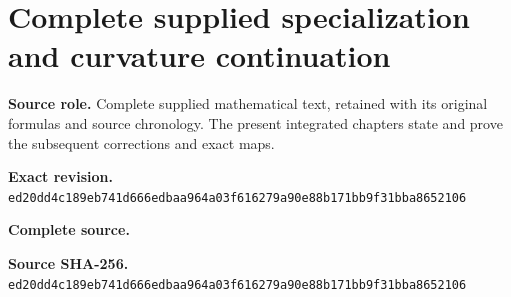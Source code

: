 \begingroup
\sloppy
\small
\clearpage
\section{Complete supplied specialization and curvature continuation}
\noindent\textbf{Source role.} Complete supplied mathematical text, retained with its original formulas and source chronology. The present integrated chapters state and prove the subsequent corrections and exact maps.\par
\noindent\textbf{Exact revision.} \nolinkurl{ed20dd4c189eb741d666edbaa964a03f616279a90e88b171bb9f31bba8652106}\par
\noindent\textbf{Complete source.} \par
\noindent\textbf{Source SHA-256.} \nolinkurl{ed20dd4c189eb741d666edbaa964a03f616279a90e88b171bb9f31bba8652106}\par\medskip

\endgroup
